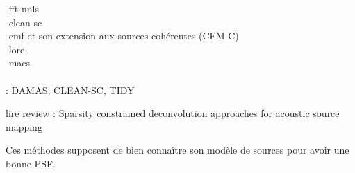 -fft-nnls\\

-clean-sc\\

-cmf et son extension aux sources cohérentes (CFM-C)\\

-lore\\

-macs\\


~\\  : DAMAS, CLEAN-SC, TIDY

lire review : Sparsity constrained deconvolution approaches for acoustic
source mapping


Ces méthodes supposent de bien connaître son modèle de sources pour avoir une bonne PSF.

